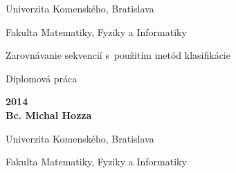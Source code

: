 \documentclass[a4paper,12pt,openany,oneside,headings=optiontohead]{scrbook} %
\renewcommand\baselinestretch{1.3} %
\theoremstyle{definition}
\def\mftitle{Zarovnávanie sekvencií s~použitím metód klasifikácie}
\def\mfthesistype{Diplomová práca}
\def\mfauthor{Bc. Michal Hozza}
\def\mfadvisor{Mgr. Tomáš Vinař, PhD.}
\def\mfdate{2014}
\def\mfuniversity{Univerzita Komenského, Bratislava}
\def\mffakulta{Fakulta Matematiky, Fyziky a Informatiky}
\begin{document}
\pagestyle{plain}
\frontmatter

\thispagestyle{empty}

\noindent
\begin{center}
\begin{minipage}{0.8\textwidth}
\centerline{\renewcommand\baselinestretch{1.3} \LARGE\sc\mfuniversity}
\centerline{\sc\mffakulta}
\end{minipage}
\end{center}

\vfill
\begin{center}
\begin{minipage}{1\textwidth}
\bigskip\bigskip
\begin{center}
\linespread{1}\LARGE\sc\mftitle
\end{center}
\smallskip
\centerline{\mfthesistype}
\bigskip
\bigskip
\bigskip\bigskip
\end{minipage}
\end{center}
\vfill
{\bf\mfdate\\
\indent\mfauthor}
\eject %


\thispagestyle{empty}

\noindent
\begin{center}
\begin{minipage}{0.8\textwidth}
\centerline{\LARGE\sc\mfuniversity}
\centerline{\sc\mffakulta}
\end{minipage}
\end{center}
\end{document}
